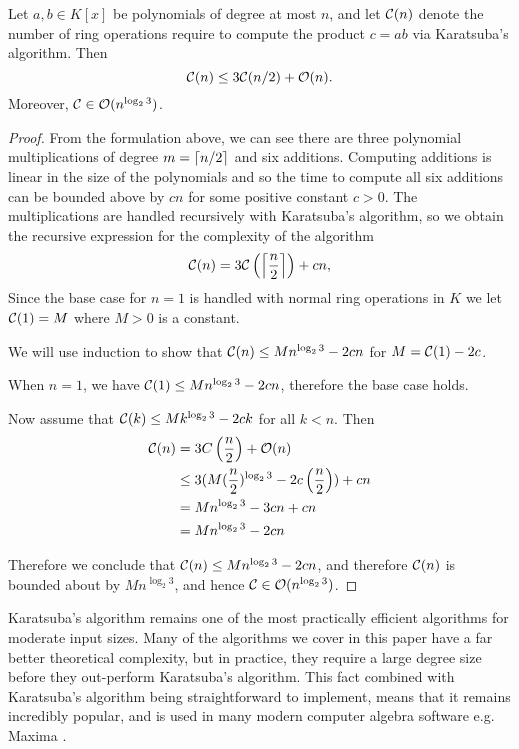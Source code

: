 \begin{theorem}
    
    Let $a, b \in K[x]$ be polynomials of degree at most $n$, and let $\mathcal C(n)$ denote the number of ring operations require to compute the product $c = ab$ via Karatsuba's algorithm. Then 
    \[
        \mathcal C(n) \le 3\mathcal C(n/2) + \mathcal O(n).
    \]
    Moreover, $\mathcal C \in \mathcal O(n^{\log_2 3})$.
\end{theorem}

\begin{proof}
    From the formulation above, we can see there are three polynomial multiplications of degree $m = \left \lceil n/2 \right \rceil$ and six additions. Computing additions is linear in the size of the polynomials and so the time to compute all six additions can be bounded above by $cn$ for some positive constant $c > 0$. The multiplications are handled recursively with Karatsuba's algorithm, so we obtain the recursive expression for the complexity of the algorithm
    \[
        \mathcal C(n) = 3\mathcal C\left(\left \lceil \frac{n}{2} \right \rceil\right) + cn,
    \]
    Since the base case for $n = 1$ is handled with normal ring operations in $K$ we let $\mathcal C(1) = M$ where $M > 0$ is a constant.

    We will use induction to show that $\mathcal C(n) \le Mn^{\log_2 3} - 2cn$ for $M = \mathcal C(1) - 2c$.

    When $n = 1$, we have $\mathcal C(1) \le Mn^{\log_2 3} - 2cn$, therefore the base case holds.

    Now assume that $\mathcal C(k) \le Mk^{\log_2 3} - 2ck$ for all $k < n$. Then 
    \begin{align*}
        \mathcal C(n) &= 3C\left(\frac{n}{2}\right) + \mathcal O(n)\\
                 &\le 3(M(\frac{n}{2})^{\log_2 3} - 2c\left(\frac{n}{2}\right)) + cn\\
                 &= Mn^{\log_2 3} - 3cn + cn\\
                 &= Mn^{\log_2 3} - 2cn
    \end{align*}

    Therefore we conclude that $\mathcal C(n) \le Mn^{\log_2 3} - 2cn$, and therefore $\mathcal C(n)$ is bounded about by $Mn^{\log_2 3}$, and hence $\mathcal C \in \mathcal O(n^{\log_2 3})$.
\end{proof}

\medskip

Karatsuba's algorithm remains one of the most practically efficient algorithms for moderate input sizes. Many of the algorithms we cover in this paper have a far better theoretical complexity, but in practice, they require a large degree size before they out-perform Karatsuba's algorithm. This fact combined with Karatsuba's algorithm being straightforward to implement, means that it remains incredibly popular, and is used in many modern computer algebra software e.g. Maxima \cite{maxima-karatsuba}.

